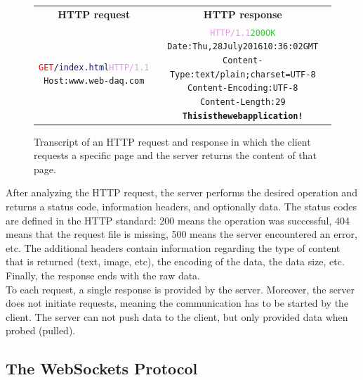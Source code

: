       \begin{figure}[h!]
        \begin{tabularx}{\textwidth}{C{1}C{1}}
          \textbf{HTTP request} & \textbf{HTTP response} \\
        { \footnotesize
\begin{alltt}
\textcolor{Red}{GET} \textcolor{MidnightBlue}{/index.html} \textcolor{Plum}{HTTP/1.1} \newline
\textcolor{BurntOrange}{Host:} www.web-daq.com
\end{alltt} } & { \footnotesize
\begin{alltt}
\textcolor{Plum}{HTTP/1.1} \textcolor{LimeGreen}{200 OK} \newline
\textcolor{BurntOrange}{Date:} Thu, 28 July 2016 10:36:02 GMT \newline
\textcolor{BurntOrange}{Content-Type:} text/plain; charset=UTF-8 \newline
\textcolor{BurntOrange}{Content-Encoding:} UTF-8 \newline
\textcolor{BurntOrange}{Content-Length:} 29 \newline
\textbf{This is the web application !}
\end{alltt} }
        \end{tabularx}
        \caption{Transcript of an HTTP request and response in which the client requests a specific page and the server returns the content of that page.}
        \label{fig:III-2-http}
      \end{figure}

      After analyzing the HTTP request, the server performs the desired operation and returns a status code, information headers, and optionally data. The status codes are defined in the HTTP standard: 200 means the operation was successful, 404 means that the request file is missing, 500 means the server encountered an error, etc. The additional headers contain information regarding the type of content that is returned (text, image, etc), the encoding of the data, the data size, etc. Finally, the response ends with the raw data. \\

      To each request, a single response is provided by the server. Moreover, the server does not initiate requests, meaning the communication has to be started by the client. The server can not push data to the client, but only provided data when probed (pulled).

    \subsection{The WebSockets Protocol}

